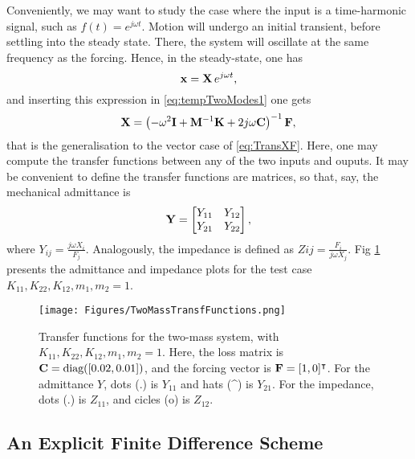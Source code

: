 Conveniently, we may want to study the case where the input is a time-harmonic signal, such as $f(t) = e^{j\omega t}$. Motion will undergo an initial transient, before settling into the steady state. There, the system will oscillate at the same frequency as the forcing. Hence, in the steady-state, one has
\begin{equation}
{\bf x} = {\bf X}\, e^{j\omega t},
\end{equation}
and inserting this expression in \eqref{eq:tempTwoModes1} one gets
\begin{equation}
{\bf X} = \left( -\omega^2 {\bf I} + {\bf M}^{-1}{\bf K} + 2 j \omega {\bf C} \right)^{-1}{\bf F},
\end{equation}
that is the generalisation to the vector case of \eqref{eq:TransXF}. Here, one may compute the transfer functions between any of the two inputs and ouputs. It may be convenient to define the transfer functions are matrices, so that, say, the mechanical admittance is
\begin{equation}
{\bf Y} = \begin{bmatrix} Y_{11} & Y_{12} \\ Y_{21} & Y_{22} \end{bmatrix},
\end{equation}
where $Y_{ij} = \frac{j \omega X_i}{ F_j}$. Analogously, the impedance is defined as $Zij = \frac{F_i}{j \omega X_j}$. Fig \ref{fig:TransFunctionsTwoMass} presents the admittance and impedance plots for the test case $K_{11},K_{22},K_{12},m_1,m_2=1$.



\begin{figure}[hbt]
\centering
\texttt{[image: Figures/TwoMassTransfFunctions.png]}
\caption{Transfer functions for the two-mass system, with $K_{11},K_{22},K_{12},m_1,m_2=1$. Here, the loss matrix is ${\bf C} = \text{diag}([0.02,0.01])$, and the forcing vector is ${\bf F} = [1,0]^\intercal$. For the admittance $Y$, dots (.) is $Y_{11}$ and hats (\^{}) is $Y_{21}$. For the impedance, dots (.) is $Z_{11}$, and cicles (o) is $Z_{12}$. }\label{fig:TransFunctionsTwoMass}
\end{figure}

\subsection{An Explicit Finite Difference Scheme}



